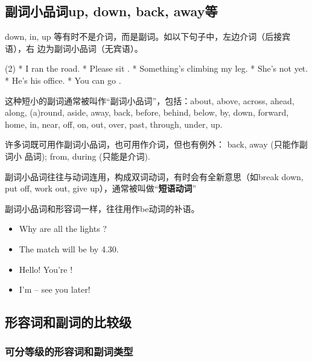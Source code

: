 


\subsection{副词小品词up, down, back, away等}

down, in, up 等有时不是介词，而是副词。如以下句子中，左边介词（后接宾语），右
边为副词小品词（无宾语）。
\begin{taskitem}(2)
* I ran  the road.
* Please sit .
* Something's climbing  my leg.
* She's not  yet.
* He's  his office.
* You can go .
\end{taskitem}

这种短小的副词通常被叫作“副词小品词”，包括：about, above, across, ahead,
along, (a)round, aside, away, back, before, behind, below, by, down,
forward, home, in, near, off, on, out, over, past, through, under, up.

许多词既可用作副词小品词，也可用作介词，但也有例外： back, away (只能作副词小
品词); from, during (只能是介词).

副词小品词往往与动词连用，构成双词动词，有时会有全新意思（如break down, put
off, work out, give up），通常被叫做“\textbf{短语动词}”

副词小品词和形容词一样，往往用作be动词的补语。
\begin{itemize}
\item Why are all the lights ?
\item The match will be  by 4.30.
\item Hello! You're !
\item I'm  – see you later!
\end{itemize}

\subsection{形容词和副词的比较级}

\subsubsection{可分等级的形容词和副词类型}

